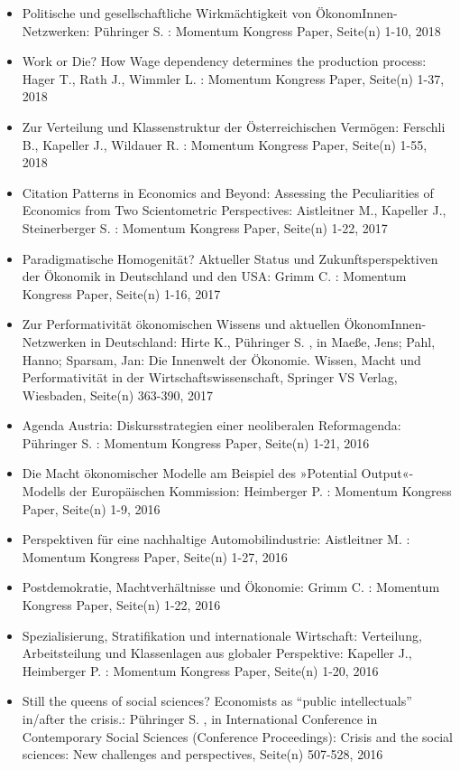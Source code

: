 \begin{itemize}
\item Politische und gesellschaftliche Wirkmächtigkeit von ÖkonomInnen-Netzwerken: Pühringer S. : Momentum Kongress Paper, Seite(n) 1-10, 2018
\item Work or Die? How Wage dependency determines the production process: Hager T., Rath J., Wimmler L. : Momentum Kongress Paper, Seite(n) 1-37, 2018
\item Zur Verteilung und Klassenstruktur der Österreichischen Vermögen: Ferschli B., Kapeller J., Wildauer R. : Momentum Kongress Paper, Seite(n) 1-55, 2018
\item Citation Patterns in Economics and Beyond: Assessing the Peculiarities of Economics from Two Scientometric Perspectives: Aistleitner M., Kapeller J., Steinerberger S. : Momentum Kongress Paper, Seite(n) 1-22, 2017
\item Paradigmatische Homogenität? Aktueller Status und Zukunftsperspektiven der Ökonomik in Deutschland und den USA: Grimm C. : Momentum Kongress Paper, Seite(n) 1-16, 2017
\item Zur Performativität ökonomischen Wissens und aktuellen ÖkonomInnen-Netzwerken in Deutschland: Hirte K., Pühringer S. , in Maeße, Jens; Pahl, Hanno; Sparsam, Jan: Die Innenwelt der Ökonomie. Wissen, Macht und Performativität in der Wirtschaftswissenschaft, Springer VS Verlag, Wiesbaden, Seite(n) 363-390, 2017
\item Agenda Austria: Diskursstrategien einer neoliberalen Reformagenda: Pühringer S. : Momentum Kongress Paper, Seite(n) 1-21, 2016
\item Die Macht ökonomischer Modelle am Beispiel des »Potential Output«-Modells der Europäischen Kommission: Heimberger P. : Momentum Kongress Paper, Seite(n) 1-9, 2016
\item Perspektiven für eine nachhaltige Automobilindustrie: Aistleitner M. : Momentum Kongress Paper, Seite(n) 1-27, 2016
\item Postdemokratie, Machtverhältnisse und Ökonomie: Grimm C. : Momentum Kongress Paper, Seite(n) 1-22, 2016
\item Spezialisierung, Stratifikation und internationale Wirtschaft: Verteilung, Arbeitsteilung und Klassenlagen aus globaler Perspektive: Kapeller J., Heimberger P. : Momentum Kongress Paper, Seite(n) 1-20, 2016
\item Still the queens of social sciences? Economists as “public intellectuals” in/after the crisis.: Pühringer S. , in International Conference in Contemporary Social Sciences (Conference Proceedings): Crisis and the social sciences: New challenges and perspectives, Seite(n) 507-528, 2016

\end{itemize}
